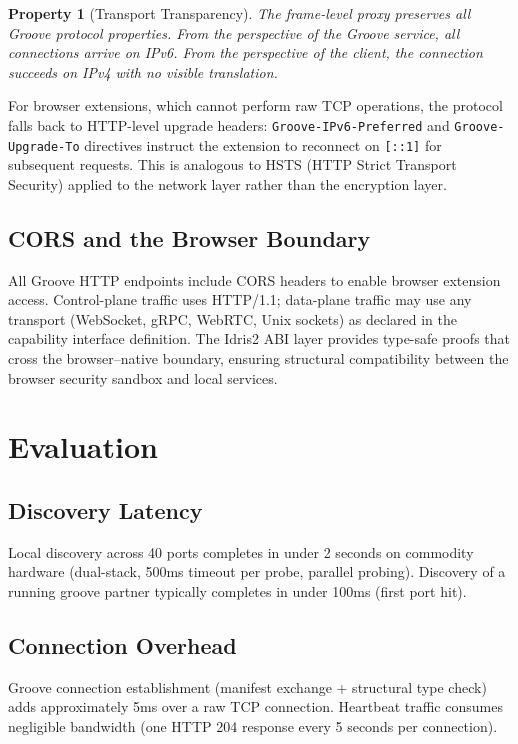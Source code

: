 \documentclass[11pt,a4paper]{article}
\newtheorem{property}{Property}
\begin{document}
\begin{property}[Transport Transparency]
The frame-level proxy preserves all Groove protocol properties. From the
perspective of the Groove service, all connections arrive on IPv6. From
the perspective of the client, the connection succeeds on IPv4 with no
visible translation.
\end{property}

For browser extensions, which cannot perform raw TCP operations, the
protocol falls back to HTTP-level upgrade headers:
\texttt{Groove-IPv6-Preferred} and \texttt{Groove-Upgrade-To} directives
instruct the extension to reconnect on \texttt{[::1]} for subsequent
requests. This is analogous to HSTS (HTTP Strict Transport Security)
applied to the network layer rather than the encryption layer.

\subsection{CORS and the Browser Boundary}

All Groove HTTP endpoints include CORS headers to enable browser extension
access. Control-plane traffic uses HTTP/1.1; data-plane traffic may use
any transport (WebSocket, gRPC, WebRTC, Unix sockets) as declared in the
capability interface definition. The Idris2 ABI layer provides type-safe
proofs that cross the browser--native boundary, ensuring structural
compatibility between the browser security sandbox and local services.

\section{Evaluation}

\subsection{Discovery Latency}

Local discovery across 40 ports completes in under 2 seconds on commodity
hardware (dual-stack, 500ms timeout per probe, parallel probing). Discovery
of a running groove partner typically completes in under 100ms (first port
hit).

\subsection{Connection Overhead}

Groove connection establishment (manifest exchange + structural type check)
adds approximately 5ms over a raw TCP connection. Heartbeat traffic
consumes negligible bandwidth (one HTTP 204 response every 5 seconds per
connection).
\end{document}
